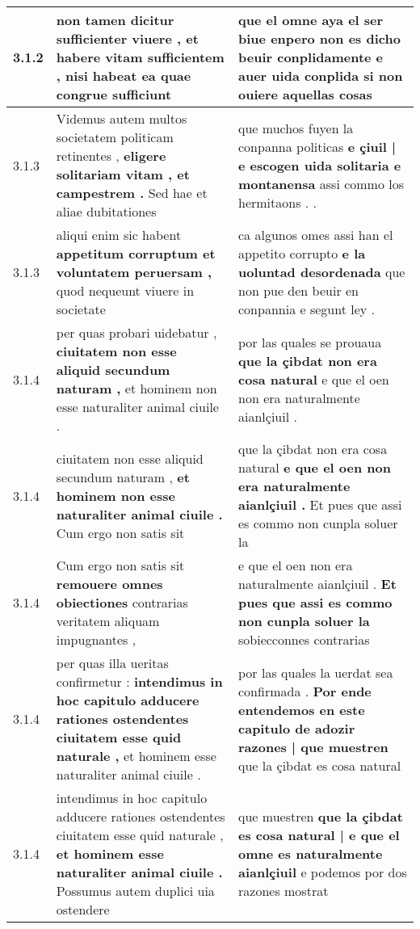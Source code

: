 \begin{tabular}{|p{1cm}|p{6.5cm}|p{6.5cm}|}
3.1.2 & non tamen dicitur sufficienter viuere , \textbf{ et habere vitam sufficientem , } nisi habeat ea quae congrue sufficiunt & que el omne aya el ser biue enpero non es dicho beuir conplidamente \textbf{ e auer uida conplida } si non ouiere aquellas cosas \\\hline
3.1.3 & Videmus autem multos societatem politicam retinentes , \textbf{ eligere solitariam vitam , et campestrem . } Sed hae et aliae dubitationes & que muchos fuyen la conpanna politicas \textbf{ e çiuil | e escogen uida solitaria e montanensa } assi commo los hermitaons . . \\\hline
3.1.3 & aliqui enim sic habent \textbf{ appetitum corruptum et voluntatem peruersam , } quod nequeunt viuere in societate & ca algunos omes assi han el appetito corrupto \textbf{ e la uoluntad desordenada } que non pue den beuir en conpannia e segunt ley . \\\hline
3.1.4 & per quas probari uidebatur , \textbf{ ciuitatem non esse aliquid secundum naturam , } et hominem non esse naturaliter animal ciuile . & por las quales se prouaua \textbf{ que la çibdat non era cosa natural } e que el oen non era naturalmente aianlçiuil . \\\hline
3.1.4 & ciuitatem non esse aliquid secundum naturam , \textbf{ et hominem non esse naturaliter animal ciuile . } Cum ergo non satis sit & que la çibdat non era cosa natural \textbf{ e que el oen non era naturalmente aianlçiuil . } Et pues que assi es commo non cunpla soluer la \\\hline
3.1.4 & Cum ergo non satis sit \textbf{ remouere omnes obiectiones } contrarias veritatem aliquam impugnantes , & e que el oen non era naturalmente aianlçiuil . \textbf{ Et pues que assi es commo non cunpla soluer la } sobiecconnes contrarias \\\hline
3.1.4 & per quas illa ueritas confirmetur : \textbf{ intendimus in hoc capitulo adducere rationes ostendentes ciuitatem esse quid naturale , } et hominem esse naturaliter animal ciuile . & por las quales la uerdat sea confirmada . \textbf{ Por ende entendemos en este capitulo de adozir razones | que muestren } que la çibdat es cosa natural \\\hline
3.1.4 & intendimus in hoc capitulo adducere rationes ostendentes ciuitatem esse quid naturale , \textbf{ et hominem esse naturaliter animal ciuile . } Possumus autem duplici uia ostendere & que muestren \textbf{ que la çibdat es cosa natural | e que el omne es naturalmente aianlçiuil } e podemos por dos razones mostrat \\\hline

\end{tabular}
